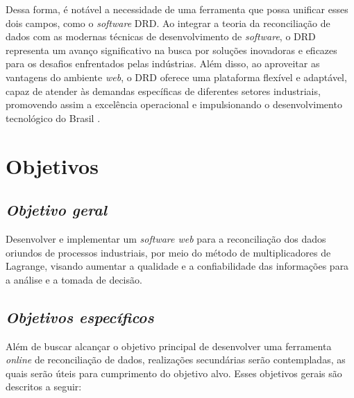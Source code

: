 Dessa forma, é notável a necessidade de uma ferramenta que possa unificar esses dois campos, como o \textit{software} DRD. Ao integrar a teoria da reconciliação de dados com as modernas técnicas de desenvolvimento de \textit{software}, o DRD representa um avanço significativo na busca por soluções inovadoras e eficazes para os desafios enfrentados pelas indústrias. Além disso, ao aproveitar as vantagens do ambiente \textit{web}, o DRD oferece uma plataforma flexível e adaptável, capaz de atender às demandas específicas de diferentes setores industriais, promovendo assim a excelência operacional e impulsionando o desenvolvimento tecnológico do Brasil \cite{industry4status}.

\section{Objetivos}
\subsection{\textit{Objetivo geral}}

Desenvolver e implementar um \textit{software web} para a reconciliação dos dados oriundos de processos industriais, por meio do método de multiplicadores de Lagrange, visando aumentar a qualidade e a confiabilidade das informações para a análise e a tomada de decisão.

\subsection{\textit{Objetivos específicos}}

Além de buscar alcançar o objetivo principal de desenvolver uma ferramenta \textit{online} de reconciliação de dados, realizações secundárias serão contempladas, as quais serão úteis para cumprimento do objetivo alvo. Esses objetivos gerais são descritos a seguir: 

